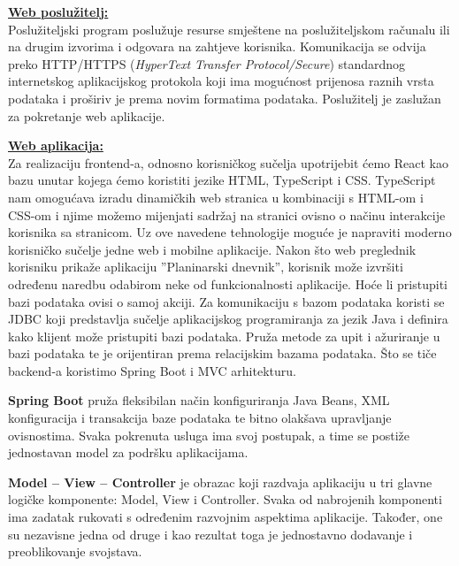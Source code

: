 		\vspace{5mm} %
		\textbf{\underline{Web poslužitelj:} }\\

		Poslužiteljski program poslužuje resurse smještene na poslužiteljskom računalu ili na drugim izvorima i odgovara na zahtjeve korisnika. Komunikacija se odvija preko HTTP/HTTPS (\textit{HyperText Transfer Protocol/Secure}) standardnog internetskog aplikacijskog protokola koji ima mogućnost prijenosa raznih vrsta podataka i proširiv je prema novim formatima podataka. Poslužitelj je zaslužan za pokretanje web aplikacije.

		\vspace{5mm} %
		
		\textbf{\underline{Web aplikacija:} }\\

		Za realizaciju frontend-a, odnosno korisničkog sučelja upotrijebit ćemo React kao bazu unutar kojega ćemo koristiti jezike HTML, TypeScript i CSS. TypeScript nam omogućava izradu dinamičkih web stranica u kombinaciji s HTML-om i CSS-om i njime možemo mijenjati sadržaj na stranici ovisno o načinu interakcije korisnika sa stranicom. Uz ove navedene tehnologije moguće je napraviti moderno korisničko sučelje jedne web i mobilne aplikacije. Nakon što web preglednik korisniku prikaže aplikaciju ''Planinarski dnevnik'', korisnik može izvršiti određenu naredbu odabirom neke od funkcionalnosti aplikacije. Hoće li pristupiti bazi podataka ovisi o samoj akciji. Za komunikaciju s bazom podataka koristi se JDBC koji predstavlja sučelje aplikacijskog programiranja za jezik Java i definira kako klijent može pristupiti bazi podataka. Pruža metode za upit i ažuriranje u bazi podataka te je orijentiran prema relacijskim bazama podataka. Što se tiče backend-a koristimo Spring Boot i MVC arhitekturu. 


		\vspace{5mm} %

		\textbf{Spring Boot} pruža fleksibilan način konfiguriranja Java Beans, XML konfiguracija i transakcija baze podataka te bitno olakšava upravljanje ovisnostima. Svaka pokrenuta usluga ima svoj postupak, a time se postiže jednostavan model za podršku aplikacijama.  


		\vspace{5mm} %

		\textbf{Model – View – Controller} je obrazac koji razdvaja aplikaciju u tri glavne logičke komponente: Model, View i Controller. Svaka od nabrojenih komponenti ima zadatak rukovati s određenim razvojnim aspektima aplikacije. Također, one su nezavisne jedna od druge i kao rezultat toga je jednostavno dodavanje i preoblikovanje svojstava.


